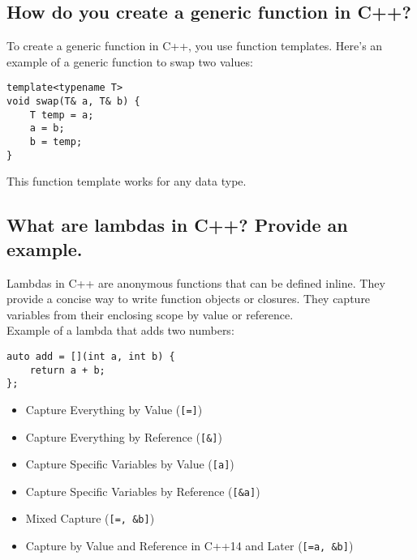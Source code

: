 \subsection{How do you create a generic function in C++?}
To create a generic function in C++, you use function templates. Here's an example of a generic function to swap two values:
\begin{tcolorbox}[title=Generic Function]
\begin{verbatim}
template<typename T>
void swap(T& a, T& b) {
    T temp = a;
    a = b;
    b = temp;
}
\end{verbatim}
\end{tcolorbox}
This function template works for any data type.

\subsection{What are lambdas in C++? Provide an example.}
Lambdas in C++ are anonymous functions that can be defined inline. They provide a concise way to write function objects or closures. They capture variables from their enclosing scope by value or reference. \\
Example of a lambda that adds two numbers:
\begin{tcolorbox}[title=Lambda Function]
\begin{verbatim}
auto add = [](int a, int b) {
    return a + b;
};
\end{verbatim}
\end{tcolorbox}
\begin{itemize}
    \item Capture Everything by Value (\texttt{[=]})
    \item Capture Everything by Reference (\texttt{[\&]})
    \item Capture Specific Variables by Value (\texttt{[a]})
    \item Capture Specific Variables by Reference (\texttt{[\&a]})
    \item Mixed Capture (\texttt{[=, \&b]})
    \item Capture by Value and Reference in C++14 and Later (\texttt{[=a, \&b]})
\end{itemize}

